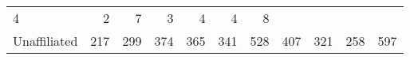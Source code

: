 \documentclass[]{article}
\begin{document}
\begin{longtable}[]{@{}lrrrrrrrrrr@{}}
\begin{minipage}[t]{0.05\columnwidth}
4\strut
\end{minipage} & \begin{minipage}[t]{0.05\columnwidth}\raggedleft\strut
2\strut
\end{minipage} & \begin{minipage}[t]{0.05\columnwidth}\raggedleft\strut
7\strut
\end{minipage} & \begin{minipage}[t]{0.06\columnwidth}\raggedleft\strut
3\strut
\end{minipage} & \begin{minipage}[t]{0.06\columnwidth}\raggedleft\strut
4\strut
\end{minipage} & \begin{minipage}[t]{0.04\columnwidth}\raggedleft\strut
4\strut
\end{minipage} & \begin{minipage}[t]{0.11\columnwidth}\raggedleft\strut
8\strut
\end{minipage}\tabularnewline
\begin{minipage}[t]{0.14\columnwidth}\raggedright\strut
Unaffiliated\strut
\end{minipage} & \begin{minipage}[t]{0.04\columnwidth}\raggedleft\strut
217\strut
\end{minipage} & \begin{minipage}[t]{0.05\columnwidth}\raggedleft\strut
299\strut
\end{minipage} & \begin{minipage}[t]{0.05\columnwidth}\raggedleft\strut
374\strut
\end{minipage} & \begin{minipage}[t]{0.05\columnwidth}\raggedleft\strut
365\strut
\end{minipage} & \begin{minipage}[t]{0.05\columnwidth}\raggedleft\strut
341\strut
\end{minipage} & \begin{minipage}[t]{0.05\columnwidth}\raggedleft\strut
528\strut
\end{minipage} & \begin{minipage}[t]{0.06\columnwidth}\raggedleft\strut
407\strut
\end{minipage} & \begin{minipage}[t]{0.06\columnwidth}\raggedleft\strut
321\strut
\end{minipage} & \begin{minipage}[t]{0.04\columnwidth}\raggedleft\strut
258\strut
\end{minipage} & \begin{minipage}[t]{0.11\columnwidth}\raggedleft\strut
597\strut
\end{minipage}\tabularnewline
\bottomrule
\end{longtable}
\end{document}
